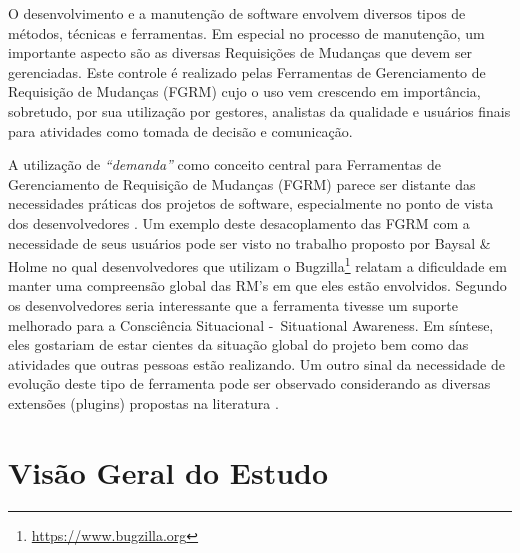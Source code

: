 O desenvolvimento e a manutenção de software envolvem diversos tipos de métodos, técnicas e
ferramentas. Em especial no processo de manutenção, um importante aspecto são as diversas
Requisições de Mudanças que devem ser gerenciadas. Este controle é realizado pelas Ferramentas de
Gerenciamento de Requisição de Mudanças (FGRM) cujo o uso vem crescendo em importância, sobretudo,
por sua utilização por gestores, analistas da qualidade e usuários finais para atividades como
tomada de decisão e comunicação.

A utilização de  \textit{``demanda''} como conceito central para Ferramentas de Gerenciamento de
Requisição de Mudanças (FGRM) parece ser distante das necessidades práticas dos projetos de
software, especialmente no ponto de vista dos desenvolvedores
\cite{Baysal:2013:SAP:2486788.2486957}. Um exemplo deste desacoplamento das FGRM com a necessidade
de seus usuários pode ser visto no trabalho proposto por Baysal \& Holme
\cite{baysal2012qualitative} no qual desenvolvedores que utilizam o
Bugzilla\footnote{\url{https://www.bugzilla.org}} relatam a dificuldade em manter uma compreensão
global das RM's em que eles estão envolvidos. Segundo os desenvolvedores seria interessante que a
ferramenta tivesse um suporte melhorado para a Consciência Situacional -~Situational Awareness. Em
síntese, eles gostariam de estar cientes da situação global do projeto bem como das atividades que
outras pessoas estão realizando. Um outro sinal da necessidade de evolução deste tipo de ferramenta
pode ser observado considerando as diversas extensões (plugins) propostas na literatura
\cite{101186,Thung:2014:BIT:2635868.2661678,Kononenko:2014:DED:2591062.2591075}.

\section{Visão Geral do Estudo}
\label{sec:intro-visao-geral}


